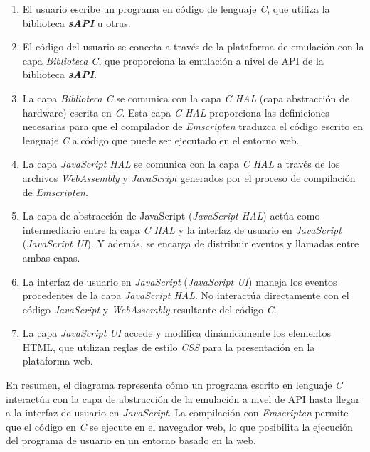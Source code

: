 \begin{enumerate}
	\item El usuario escribe un programa en código de lenguaje \textit{C}, que utiliza la biblioteca \textit{\textbf{sAPI}} u otras. 
	
	\item El código del usuario se conecta a través de la plataforma de emulación con la capa 
\textit{Biblioteca C}, que proporciona la emulación a nivel de API de la biblioteca \textit{\textbf{sAPI}}.
	
	\item La capa \textit{Biblioteca C} se comunica con la capa \textit{C HAL} (capa abstracción de hardware) escrita en \textit{C}. Esta capa \textit{C HAL} proporciona las definiciones necesarias para que el compilador de \textit{Emscripten} traduzca el código escrito en lenguaje \textit{C} a código que puede ser ejecutado en el entorno web.
	
	\item La capa \textit{JavaScript HAL} se comunica con la capa \textit{C HAL}  a través de los archivos \textit{WebAssembly} y \textit{JavaScript} generados por el proceso de compilación de \textit{Emscripten}.
	
	\item La capa de abstracción de JavaScript (\textit{JavaScript HAL}) actúa como intermediario entre la capa \textit{C HAL} y la interfaz de usuario en \textit{JavaScript} (\textit{JavaScript UI}). Y además, se encarga de distribuir eventos y llamadas entre ambas capas.
	
\item La interfaz de usuario en \textit{JavaScript} (\textit{JavaScript UI}) maneja los eventos procedentes de la capa \textit{JavaScript HAL}. No interactúa directamente con el código \textit{JavaScript} y \textit{WebAssembly} resultante del código \textit{C}.

\item La capa \textit{JavaScript UI} accede y modifica dinámicamente los elementos HTML, que utilizan reglas de estilo \textit{CSS} para la presentación en la plataforma web.
	
\end{enumerate}


En resumen, el diagrama representa cómo un programa escrito en lenguaje \textit{C} interactúa con la capa de abstracción de la emulación a nivel de API hasta llegar a la interfaz de usuario en \textit{JavaScript}. La compilación con \textit{Emscripten} permite que el código en \textit{C} se ejecute en el navegador web, lo que posibilita la ejecución del programa de usuario en un entorno basado en la web.


